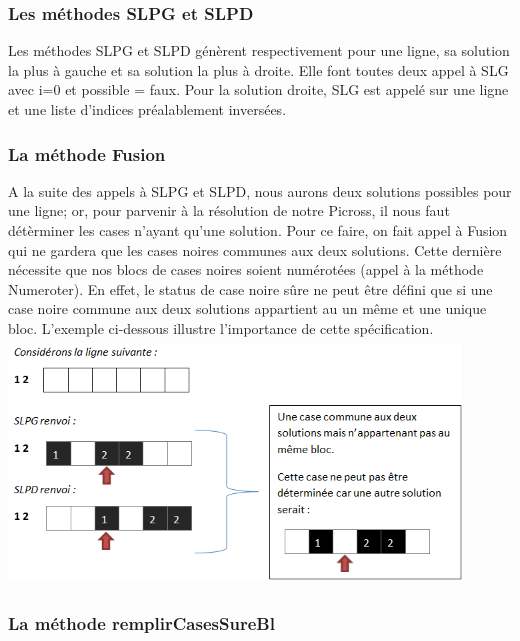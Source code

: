 \documentclass{article}
\begin{document}
\subsubsection{Les m\'ethodes SLPG et SLPD}
Les m\'ethodes SLPG et SLPD g\'en\`erent respectivement pour une ligne, sa solution la plus \`a gauche et sa solution la plus \`a droite. Elle font toutes deux appel \`a SLG avec i=0 et possible = faux. 
\newline
Pour la solution droite, SLG est appel\'e sur une ligne et une liste d'indices pr\'ealablement invers\'ees.
\subsubsection{La m\'ethode Fusion}
A la suite des appels \`a SLPG et SLPD, nous aurons deux solutions possibles pour une ligne; or, pour parvenir \`a la r\'esolution de notre Picross, il nous faut d\'et\`erminer les cases n'ayant qu'une solution. 
\newline
Pour ce faire, on fait appel \`a Fusion qui ne gardera que les cases noires communes aux deux solutions.
Cette derni\`ere n\'ecessite que nos blocs de cases noires soient num\'erot\'ees (appel \`a la m\'ethode Numeroter).
\newline
En effet, le status de case noire s\^ure ne peut \^etre d\'efini que si une case noire commune aux deux solutions appartient au un m\^eme et une unique bloc.
\newline
L'exemple ci-dessous illustre l'importance de cette sp\'ecification.  
\newline
\includegraphics[height=6.5cm,width=12cm]{Exemple1}
\subsubsection{La m\'ethode remplirCasesSureBl}
\end{document}
